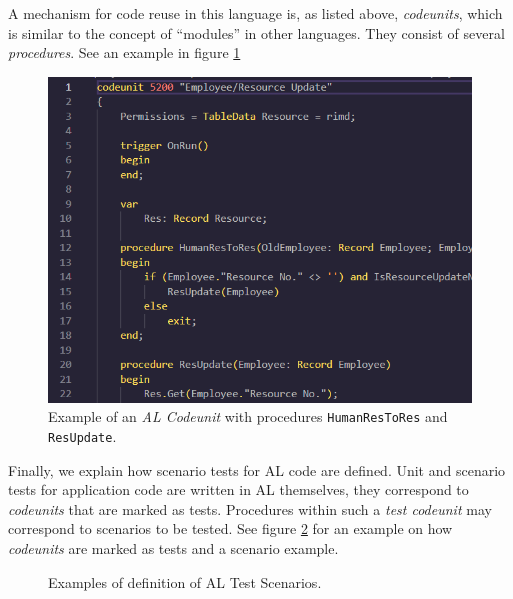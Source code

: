 \documentclass{article}
\begin{document}
A mechanism for code reuse in this language is, as listed above, \emph{codeunits}, which is similar to the concept of ``modules'' in other languages. They consist of several \emph{procedures}. See an example in figure \ref{fig:codeunit-example}
\begin{figure}[H]
  \includegraphics[width=\textwidth]{images/alcodeunit.png}
  \caption{Example of an \emph{AL Codeunit} with procedures \texttt{HumanResToRes} and \texttt{ResUpdate}.}
  \label{fig:codeunit-example}
\end{figure}

Finally, we explain how scenario tests for AL code are defined. Unit and scenario tests for application code are written in AL themselves, they correspond to \emph{codeunits} that are marked as tests. Procedures within such a \emph{test codeunit} may correspond to scenarios to be tested. See figure \ref{fig:al-test-examples} for an example on how \emph{codeunits} are marked as tests and a scenario example.

\begin{figure}[H]
  \centering
  \qquad
  \caption{Examples of definition of AL Test Scenarios. }
  \label{fig:al-test-examples}
\end{figure}
\end{document}
